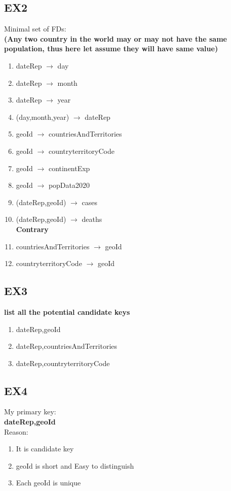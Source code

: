 \documentclass[]{article}
\begin{document}
\subsection{EX2}
Minimal set of FDs:\\
\textbf{(Any two country in the world may or may not have the same population, thus here let assume they will have same value)}
\begin{enumerate}
    \item  dateRep $\to$ day
    \item  dateRep $\to$ month
    \item  dateRep $\to$ year
    \item (day,month,year) $\to$ dateRep
    \item geoId $\to$ countriesAndTerritories
    \item geoId $\to$ countryterritoryCode
    \item geoId $\to$ continentExp
    \item geoId $\to$ popData2020
    \item (dateRep,geoId)  $\to$ cases
    \item (dateRep,geoId)  $\to$ deaths\\
    \textbf{Contrary}
    \item countriesAndTerritories $\to$ geoId
    \item countryterritoryCode $\to$ geoId
\end{enumerate}

\subsection{EX3}
\textbf{list all the potential candidate keys}
\begin{enumerate}
    \item  dateRep,geoId
    \item  dateRep,countriesAndTerritories
    \item  dateRep,countryterritoryCode
\end{enumerate}

\subsection{EX4}
My primary key: \\
\textbf{ dateRep,geoId }\\
Reason: 
\begin{enumerate}
    \item  It is candidate key
    \item  geoId is short and Easy to distinguish
    \item  Each geoId is unique
\end{enumerate}
\end{document}
